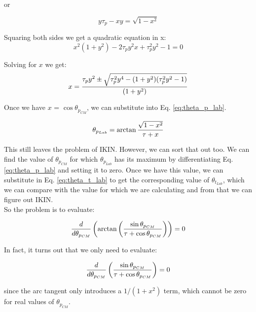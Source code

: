 or

\begin{equation}
y \tau_p - xy = \sqrt{1 - x^2}
\label{eq:theta_t_lab5}
\end{equation}

Squaring both sides we get a quadratic equation in x:
\begin{equation}
x^2 (1 + y^2) - 2 \tau_p y^2 x + \tau_p^2 y^2 - 1 = 0
\label{eq:theta_t_lab6}
\end{equation}

Solving for $x$ we get:
\begin{equation}
x = {\tau_p y^2 \pm \sqrt{\tau_p^2 y^4 - (1 + y^2) (\tau_p^2 y^2 - 1)}
\over (1 + y^2)}
\label{eq:theta_t_lab7}
\end{equation}

Once we have $x$ = $\cos \theta_{p_{CM}}$, we can substitute into Eq.
\ref{eq:theta_p_lab}.

\begin{equation}
\theta_{p_{Lab}} = \arctan {\sqrt{1 - x^2} \over \tau + x}
\label{eq:theta_p_lab2}
\end{equation}

This still leaves the problem of IKIN. However, we can sort that out too. We
can find the value of $\theta_{p_{CM}}$ for which $\theta_{p_{Lab}}$ has its
maximum by differentiating Eq. \ref{eq:theta_p_lab} and setting it to zero.
Once we have this value, we can substitute in Eq. \ref{eq:theta_t_lab} to
get the corresponding value of $\theta_{t_{Lab}}$, which we can compare with
the value for which we are calculating and from that we can figure out IKIN.\\

So the problem is to evaluate:

\begin{equation}
{d \over d\theta_{p_{CM}}} \left( \arctan \left({\sin \theta_{p_{CM}} \over
\tau + \cos \theta_{p_{CM}}} \right) \right) = 0
\label{eq:dtheta_p_lab}
\end{equation}

In fact, it turns out that we only need to evaluate:

\begin{equation}
{d \over d\theta_{p_{CM}}} \left( {\sin \theta_{p_{CM}} \over
\tau + \cos \theta_{p_{CM}}} \right) = 0
\label{eq:dtheta_p_lab2}
\end{equation}

since the arc tangent only introduces a $1 / (1 + x^2)$ term, which cannot be
zero for real values of $\theta_{p_{CM}}$.\\

